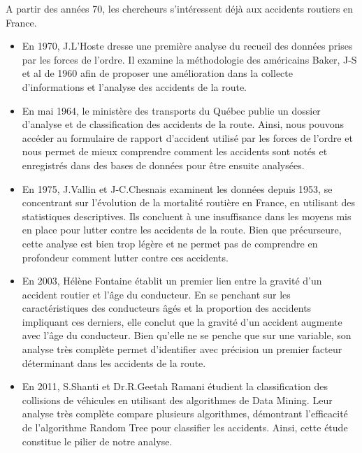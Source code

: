 \documentclass[french]{article}
\begin{document}
A partir des années 70, les chercheurs s’intéressent déjà aux accidents routiers en France. 
\begin{itemize}
    \item En 1970, J.L’Hoste \cite{etude-clinique-accidents} dresse une première analyse du recueil des données prises par les forces de l’ordre. Il examine la méthodologie des américains Baker, J-S et al de 1960 afin de proposer une amélioration dans la collecte d’informations et l’analyse des accidents de la route.
    \item En mai 1964, le ministère des transports du Québec \cite{rapport-accident-canada} publie un dossier d’analyse et de classification des accidents de la route. Ainsi, nous pouvons accéder au formulaire de rapport d’accident utilisé par les forces de l’ordre et nous permet de mieux comprendre comment les accidents sont notés et enregistrés dans des bases de données pour être ensuite analysées.
    \item En 1975, J.Vallin et J-C.Chesnais \cite{accidents1953} examinent les données depuis 1953, se concentrant sur l’évolution de la mortalité routière en France, en utilisant des statistiques descriptives. Ils concluent à une insuffisance dans les moyens mis en place pour lutter contre les accidents de la route. Bien que précurseure, cette analyse est bien trop légère et ne permet pas de comprendre en profondeur comment lutter contre ces accidents.
    \item En 2003, Hélène Fontaine \cite{FONTAINE2003107} établit un premier lien entre la gravité d’un accident routier et l’âge du conducteur. En se penchant sur les caractéristiques des conducteurs âgés et la proportion des accidents impliquant ces derniers, elle conclut que la gravité d’un accident augmente avec l’âge du conducteur. Bien qu’elle ne se penche que sur une variable, son analyse très complète permet d’identifier avec précision un premier facteur déterminant dans les accidents de la route.
    \item En 2011, S.Shanti et Dr.R.Geetah Ramani \cite{classification-colision} étudient la classification des collisions de véhicules en utilisant des algorithmes de Data Mining. Leur analyse très complète compare plusieurs algorithmes, démontrant l’efficacité de l’algorithme Random Tree pour classifier les accidents. Ainsi, cette étude constitue le pilier de notre analyse.
\end{itemize}
\end{document}
